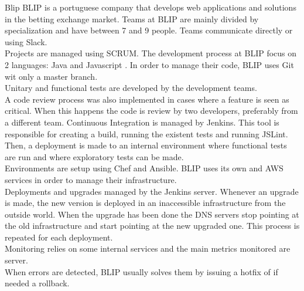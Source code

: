     \begin{companyreport}{Blip}
      \product
      BLIP is a portuguese company that develops web applications and solutions in the betting exchange market.
      \teams
      Teams at BLIP are mainly divided by specialization and have between 7 and 9 people. Teams communicate directly or using Slack. \\
      Projects are managed using SCRUM.
      \development
      The development process at BLIP focus on 2 languages: Java and Javascript . In order to manage their code, BLIP uses Git wit only a master branch. \\
      Unitary and functional tests are developed by the development teams. \\
      A code review process was also implemented in cases where a feature is seen as critical. When this happens the code is review by two developers, preferably from a different team.
      Continuous Integration is managed by Jenkins. This tool is  responsible for creating a build, running the existent tests and running JSLint. Then, a deployment is made to an internal environment where functional tests are run and where exploratory tests can be made. \\
      Environments are setup using Chef and Ansible.
      \operations
      BLIP uses its own and AWS services in order to manage their infrastructure. \\
      Deployments and upgrades managed by the Jenkins server. Whenever an upgrade is made, the new version is deployed in an inaccessible infrastructure from the outside world. When the upgrade has been done the DNS servers stop pointing at the old infrastructure and start pointing at the new upgraded one. This process is repeated for each deployment. \\
      Monitoring relies on some internal services and the main metrics monitored are server.\\
      When errors are detected, BLIP usually solves them by issuing a hotfix of if needed a rollback.
      \reportend
    \end{companyreport}

